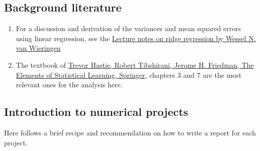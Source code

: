 \documentclass[%
oneside,                 %
final,                   %
10pt]{article}
\begin{document}
\subsection{Background literature}

\begin{enumerate}
\item For a discussion and derivation of the variances and mean squared errors using linear regression, see the \href{{https://arxiv.org/abs/1509.09169}}{Lecture notes on ridge regression by Wessel N. van Wieringen}

\item The textbook of \href{{https://www.springer.com/gp/book/9780387848570}}{Trevor Hastie, Robert Tibshirani, Jerome H. Friedman, The Elements of Statistical Learning, Springer}, chapters 3 and 7 are the most relevant ones for the analysis here. 
\end{enumerate}

\noindent
\subsection{Introduction to numerical projects}

Here follows a brief recipe and recommendation on how to write a report for each
project.
\end{document}
